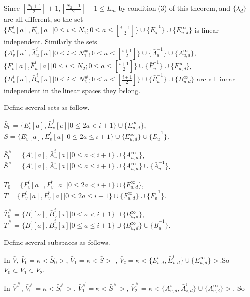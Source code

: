 \def\CTEXPreproc{Created by ctex v0.2.12, don't edit!}\documentclass[11pt]{article}
\begin{document}
\begin{pf}
       Since $[\frac{N_1 +1}{2}]+1 , [\frac{N_2 +1}{2}]+1  \leq L_m$ by condition (3) of this theorem, and $\{ \lambda_d \}$ are all different,  so the set $\{ E^i _v [a], \bar{E}^i _u [a] | 0\leq i\leq N_1 ;0\leq a\leq [\frac{i+1}{2}] \}  \cup \{ \bar{E}^{-1}_u \} \cup   \{ E^{\infty}_{u,d} \} $ is linear independent.
       Similarly the sets $\{ A^i _v [a], \bar{A}^i _u [a] | 0\leq i\leq N^{\#} _1 ;0\leq a\leq [\frac{i+1}{2}] \}  \cup \{  \bar{A}^{-1}_{u}   \}  \cup \{ A^{\infty}_{u,d} \} $,  $\{ F^i _v [a], \bar{F}^i _u [a] | 0\leq i\leq N_2 ;0\leq a\leq [\frac{i+1}{2}] \}  \cup \{ \bar{F}^{-1}_{u} \} \cup \{ F^{\infty}_{u,d} \} $,   $\{ B^i _v [a], \bar{B}^i _u [a] | 0\leq i\leq N^{\#} _2 ;0\leq a\leq [\frac{i+1}{2}] \}  \cup \{ \bar{B}^{-1}_{u} \} \cup \{ B^{\infty}_{u,d} \} $ are all linear independent in the linear spaces they belong.

       Define several sets as follow.

        $\bar{S}_0 = \{ E^{i}_{v}[a], \bar{E}^{i}_{v}[a]| 0\leq 2a < i+1 \} \cup \{ E^{\infty}_{u,d} \} $,  $\bar{S}= \{ E^{i}_{v}[a], \bar{E}^{i}_{v}[a]| 0\leq 2a \leq i+1 \} \cup \{ E^{\infty}_{u,d} \} \cup \{  \bar{E}^{-1}_u \}$.

         $\bar{S}^{\#}_0 = \{ A^{i}_{v}[a], \bar{A}^{i}_{v}[a]| 0\leq a < i+1 \}   \cup \{ A^{\infty}_{u,d} \} $,  $\bar{S}^{\#} = \{ A^{i}_{v}[a], \bar{A}^{i}_{v}[a]| 0\leq a \leq i+1 \}  \cup \{ A^{\infty}_{u,d} \} \cup \{ \bar{A}^{-1}_u \}  $.

        $\bar{T}_0 = \{ F^{i}_{v}[a], \bar{F}^{i}_{v}[a]| 0\leq 2a < i+1 \} \cup \{ F^{\infty}_{u,d} \} $, $\bar{T}= \{ F^{i}_{v}[a], \bar{F}^{i}_{v}[a]| 0\leq 2a \leq i+1 \} \cup \{ F^{\infty}_{u,d} \} \cup \{ \bar{F}^{-1}_u \}   $.

         $\bar{T}^{\#}_0 =\{ B^{i}_{v}[a], \bar{B}^{i}_{v}[a]| 0\leq a < i+1 \}  \cup \{ B^{\infty}_{u,d} \} $,  $\bar{T}^{\#}= \{ B^{i}_{v}[a], \bar{B}^{i}_{v}[a]| 0\leq a \leq i+1 \}   \cup \{ B^{\infty}_{u,d} \}  \cup \{ \bar{B}^{-1}_u \}$.

      Define several subspaces as follows.



      \noindent In $\bar{V}$, $\bar{V}_0 =\kappa <\bar{S}_0   > $, $\bar{V}_1 =\kappa <  \bar{S} > $ ,
        $\bar{V}_2 = \kappa <\{ E^{i}_{v,d} , \bar{E}^{i}_{v,d}\} \cup \{ E^{\infty}_{u,d} \}  >$.So
       $\bar{V}_0 \subset \bar{V}_1 \subset \bar{V}_2$.

     \noindent   In  $  \bar{V}^{\#} $,  $\bar{V}^{\#}_0 =\kappa < \bar{S}^{\#}_0  > $,   $\bar{V}^{\#}_1 = \kappa < \bar{S}^{\#} >$,   $\bar{V}^{\#}_2 =\kappa < \{ A^{i}_{v,d} , \bar{A}^{i}_{v,d}\} \cup \{ A^{\infty}_{v,d} \}  >$. So


\end{pf}
\end{document}

